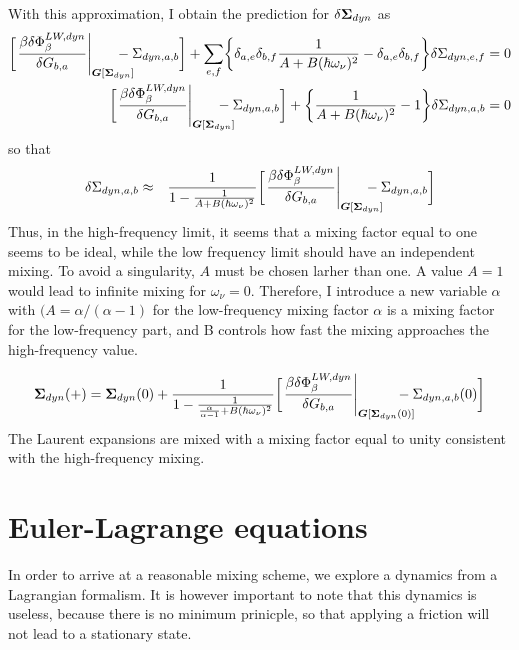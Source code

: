 \documentclass[11pt,a4paper]{report}
\begin{document}
With this approximation, I obtain the prediction for
$\delta\bm{\Sigma}_{dyn}$ as
\begin{eqnarray}
\biggl[\left.\frac{\beta\delta\Phi^{LW,dyn}_\beta}{\delta G_{b,a}}
\right|_{\mat{G}[\mat{\Sigma}_{dyn}]}\hspace{-0.5cm}
-\Sigma_{dyn,a,b}
\biggr]
+
\sum_{e,f}
\biggl\lbrace
\delta_{a,e}\delta_{b,f}
\frac{1}{A+B(\hbar\omega_\nu)^2}
-\delta_{a,e}\delta_{b,f}
\biggr\rbrace
\delta\Sigma_{dyn,e,f}
=0
\nonumber\\
\biggl[\left.\frac{\beta\delta\Phi^{LW,dyn}_\beta}{\delta G_{b,a}}
\right|_{\mat{G}[\mat{\Sigma}_{dyn}]}\hspace{-0.5cm}
-\Sigma_{dyn,a,b}
\biggr]
+
\biggl\lbrace
\frac{1}{A+B(\hbar\omega_\nu)^2}
-1
\biggr\rbrace
\delta\Sigma_{dyn,a,b}
=0
\end{eqnarray}
so that
\begin{eqnarray}
\delta\Sigma_{dyn,a,b}
&\approx&\frac{1}{1-\frac{1}{A+B(\hbar\omega_\nu)^2}}
\biggl[\left.\frac{\beta\delta\Phi^{LW,dyn}_\beta}{\delta G_{b,a}}
\right|_{\mat{G}[\mat{\Sigma}_{dyn}]}\hspace{-0.5cm}
-\Sigma_{dyn,a,b}
\biggr]
\end{eqnarray}
Thus, in the high-frequency limit, it seems that a mixing factor equal
to one seems to be ideal, while the low frequency limit should have an
independent mixing. To avoid a singularity, $A$ must be chosen larher
than one. A value $A=1$ would lead to infinite mixing for
$\omega_\nu=0$. Therefore, I introduce a new variable $\alpha$ with
$(A=\alpha/(\alpha-1)$ for the low-frequency mixing factor $\alpha$ is
a mixing factor for the low-frequency part, and B controls how fast
the mixing approaches the high-frequency value.

\begin{eqnarray}
\mat{\Sigma}_{dyn}(+)=\mat{\Sigma}_{dyn}(0)
+\frac{1}{1-\frac{1}{\frac{\alpha}{\alpha-1}+B(\hbar\omega_\nu)^2}}
\biggl[\left.\frac{\beta\delta\Phi^{LW,dyn}_\beta}{\delta G_{b,a}}
\right|_{\mat{G}[\mat{\Sigma}_{dyn}(0)]}\hspace{-0.5cm}
-\Sigma_{dyn,a,b}(0)
\biggr]
\label{eq:mixingsigma}
\end{eqnarray}
The Laurent expansions are mixed with a mixing factor equal to unity
consistent with the high-frequency mixing.


\section{Euler-Lagrange equations}
In order to arrive at a reasonable mixing scheme, we explore a
dynamics from a Lagrangian formalism. It is however important to note
that this dynamics is useless, because there is no minimum prinicple,
so that applying a friction will not lead to a stationary state.
\end{document}

